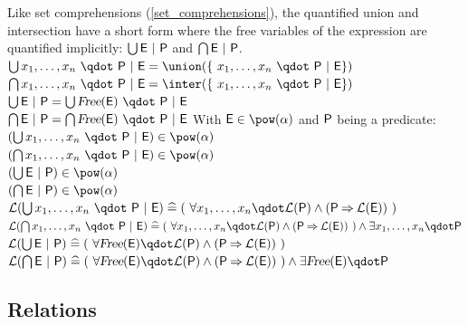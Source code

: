 \begin{samepage}
\begin{rodinrefentry}
    Like set comprehensions (\ref{set_comprehensions}), the quantified union and intersection have a
    short form where the free variables of the expression are quantified implicitly:
    $\bigcup\nolimits \textsf{E}~|~\textsf{P}$ and $\bigcap\nolimits \textsf{E}~|~\textsf{P}$.
  \rrdef
    $\Union x_1,\ldots,x_n~\qdot~\predp~|~\expre = \union(\{~x_1,\ldots,x_n~\qdot~\predp~|~\expre\})$\\
    $\Inter x_1,\ldots,x_n~\qdot~\predp~|~\expre = \inter(\{~x_1,\ldots,x_n~\qdot~\predp~|~\expre\})$\\
    $\Union \expre~|~\predp = \Union \freeids{\expre}~\qdot~\predp~|~\expre$\\
    $\Inter \expre~|~\predp = \Inter \freeids{\expre}~\qdot~\predp~|~\expre$
  \rrtypes
    With $\expre\in\pow(\alpha)$ and $\textsf{P}$ being a predicate:\\
    $(\Union x_1,\ldots,x_n~\qdot~\predp~|~\expre) \in \pow(\alpha)$\\
    $(\Inter x_1,\ldots,x_n~\qdot~\predp~|~\expre) \in \pow(\alpha)$\\
    $(\Union \expre~|~\predp) \in \pow(\alpha)$\\
    $(\Inter \expre~|~\predp) \in \pow(\alpha)$\\
  \rrwd
    $\wdl(\Union x_1,\ldots,x_n~\qdot~\predp~|~\expre) \defi (~\forall x_1,\ldots,x_n \qdot \wdl(\predp) \land (\predp\limp\wdl(\expre))~)$\\
    $\wdl(\Inter x_1,\ldots,x_n~\qdot~\predp~|~\expre) \defi (~\forall x_1,\ldots,x_n \qdot \wdl(\predp) \land (\predp\limp\wdl(\expre))~) \land \exists x_1,\ldots,x_n \qdot \predp$\\
    $\wdl(\Union \expre~|~\predp) \defi (~\forall\freeids{\expre} \qdot \wdl(\predp) \land (\predp\limp\wdl(\expre))~)$\\
    $\wdl(\Inter \expre~|~\predp) \defi (~\forall\freeids{\expre} \qdot \wdl(\predp) \land (\predp\limp\wdl(\expre))~) \land \exists\freeids{\expre} \qdot \predp$
\end{rodinrefentry}
\end{samepage}

\subsection{Relations}
\label{relations}

